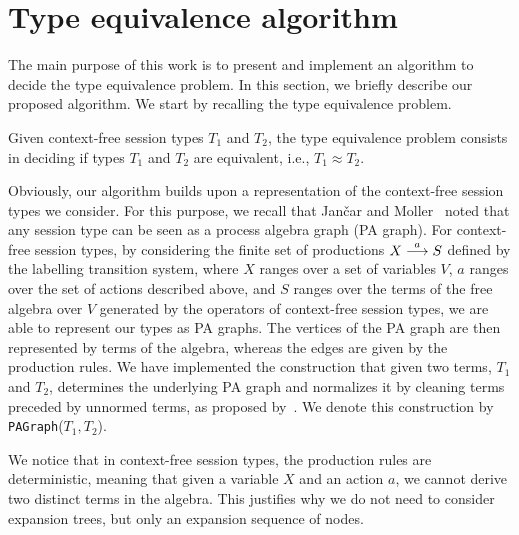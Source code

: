 
\section{Type equivalence algorithm}
\label{sec:algorithm}

The main purpose of this work is to present and implement an algorithm to decide the type equivalence problem. In this section, we briefly describe our proposed algorithm. We start by recalling the type equivalence problem.

\begin{definition}
	Given context-free session types $T_1$ and $T_2$, the type equivalence problem consists in deciding if types $T_1$ and $T_2$ are equivalent, i.e., $T_1\approx T_2$.
\end{definition}

Obviously, our algorithm builds upon a representation of the context-free session types we consider. For this purpose, we recall that Jan{\v{c}}ar and Moller~\cite{janvcar1999techniques} noted that any session type can be seen as a process algebra graph (PA graph). For context-free session types, by considering the finite set of productions $X \stackrel{a}{\longrightarrow} S$ defined by the labelling transition system, where $X$ ranges over a set of variables $V$, $a$ ranges over the set of actions described above, and $S$ ranges over the terms of the free algebra over $V$ generated by the operators of context-free session types, we are able to represent our types as PA graphs. The vertices of the PA graph are then represented by terms of the algebra, whereas the edges are given by the production rules. We have implemented the construction that given two terms, $T_1$ and $T_2$, determines the underlying PA graph and normalizes it by cleaning terms preceded by unnormed terms, as proposed by~\cite{janvcar1999techniques}. We denote this construction by \texttt{PAGraph}($T_1,T_2$).

We notice that in context-free session types, the production rules are deterministic, meaning that given a variable $X$ and an action $a$, we cannot derive two distinct terms in the algebra. This justifies why we do not need to consider expansion trees, but only an expansion sequence of nodes.

